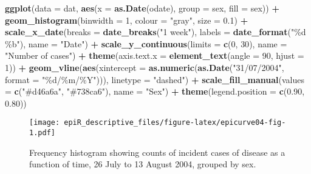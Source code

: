 \documentclass[
]{article}
\newenvironment{Shaded}{\begin{snugshade}}{\end{snugshade}}
\newcommand{\DataTypeTok}[1]{\textcolor[rgb]{0.13,0.29,0.53}{#1}}
\newcommand{\DecValTok}[1]{\textcolor[rgb]{0.00,0.00,0.81}{#1}}
\newcommand{\FloatTok}[1]{\textcolor[rgb]{0.00,0.00,0.81}{#1}}
\newcommand{\KeywordTok}[1]{\textcolor[rgb]{0.13,0.29,0.53}{\textbf{#1}}}
\newcommand{\NormalTok}[1]{#1}
\newcommand{\OperatorTok}[1]{\textcolor[rgb]{0.81,0.36,0.00}{\textbf{#1}}}
\newcommand{\StringTok}[1]{\textcolor[rgb]{0.31,0.60,0.02}{#1}}
\begin{document}
\begin{Shaded}
\begin{Highlighting}[]

\KeywordTok{ggplot}\NormalTok{(}\DataTypeTok{data =}\NormalTok{ dat, }\KeywordTok{aes}\NormalTok{(}\DataTypeTok{x =} \KeywordTok{as.Date}\NormalTok{(odate), }\DataTypeTok{group =}\NormalTok{ sex, }\DataTypeTok{fill =}\NormalTok{ sex)) }\OperatorTok{+}
\StringTok{  }\KeywordTok{geom\_histogram}\NormalTok{(}\DataTypeTok{binwidth =} \DecValTok{1}\NormalTok{, }\DataTypeTok{colour =} \StringTok{"gray"}\NormalTok{, }\DataTypeTok{size =} \FloatTok{0.1}\NormalTok{) }\OperatorTok{+}
\StringTok{  }\KeywordTok{scale\_x\_date}\NormalTok{(}\DataTypeTok{breaks =} \KeywordTok{date\_breaks}\NormalTok{(}\StringTok{"1 week"}\NormalTok{), }\DataTypeTok{labels =} \KeywordTok{date\_format}\NormalTok{(}\StringTok{"\%d \%b"}\NormalTok{), }
     \DataTypeTok{name =} \StringTok{"Date"}\NormalTok{) }\OperatorTok{+}
\StringTok{  }\KeywordTok{scale\_y\_continuous}\NormalTok{(}\DataTypeTok{limits =} \KeywordTok{c}\NormalTok{(}\DecValTok{0}\NormalTok{, }\DecValTok{30}\NormalTok{), }\DataTypeTok{name =} \StringTok{"Number of cases"}\NormalTok{) }\OperatorTok{+}
\StringTok{  }\KeywordTok{theme}\NormalTok{(}\DataTypeTok{axis.text.x =} \KeywordTok{element\_text}\NormalTok{(}\DataTypeTok{angle =} \DecValTok{90}\NormalTok{, }\DataTypeTok{hjust =} \DecValTok{1}\NormalTok{)) }\OperatorTok{+}\StringTok{ }
\StringTok{  }\KeywordTok{geom\_vline}\NormalTok{(}\KeywordTok{aes}\NormalTok{(}\DataTypeTok{xintercept =} \KeywordTok{as.numeric}\NormalTok{(}\KeywordTok{as.Date}\NormalTok{(}\StringTok{"31/07/2004"}\NormalTok{, }\DataTypeTok{format =} \StringTok{"\%d/\%m/\%Y"}\NormalTok{))), }
   \DataTypeTok{linetype =} \StringTok{"dashed"}\NormalTok{) }\OperatorTok{+}\StringTok{ }
\StringTok{  }\KeywordTok{scale\_fill\_manual}\NormalTok{(}\DataTypeTok{values =} \KeywordTok{c}\NormalTok{(}\StringTok{"\#d46a6a"}\NormalTok{, }\StringTok{"\#738ca6"}\NormalTok{), }\DataTypeTok{name =} \StringTok{"Sex"}\NormalTok{) }\OperatorTok{+}
\StringTok{  }\KeywordTok{theme}\NormalTok{(}\DataTypeTok{legend.position =} \KeywordTok{c}\NormalTok{(}\FloatTok{0.90}\NormalTok{, }\FloatTok{0.80}\NormalTok{))}
\end{Highlighting}
\end{Shaded}

\begin{figure}
\centering
\texttt{[image: epiR\_descriptive\_files/figure-latex/epicurve04-fig-1.pdf]}
\caption{\label{fig:epicurve04}Frequency histogram showing counts of
incident cases of disease as a function of time, 26 July to 13 August
2004, grouped by sex.}
\end{figure}
\end{document}
